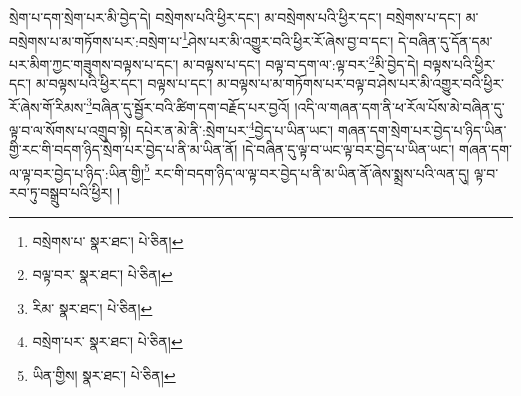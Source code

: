 སྲེག་པ་དག་སྲེག་པར་མི་བྱེད་དེ། བསྲེགས་པའི་ཕྱིར་དང་། མ་བསྲེགས་པའི་ཕྱིར་དང་། བསྲེགས་པ་དང་། མ་བསྲེགས་པ་མ་གཏོགས་པར་:བསྲེག་པ་\footnote{བསྲེགས་པ་  སྣར་ཐང་།  པེ་ཅིན། }ཤེས་པར་མི་འགྱུར་བའི་ཕྱིར་རོ་ཞེས་བྱ་བ་དང་། དེ་བཞིན་དུ་དོན་དམ་པར་མིག་ཀྱང་གཟུགས་བལྟས་པ་དང་། མ་བལྟས་པ་དང་། བལྟ་བ་དག་ལ་:ལྟ་བར་\footnote{བལྟ་བར་  སྣར་ཐང་།  པེ་ཅིན། }མི་བྱེད་དེ། བལྟས་པའི་ཕྱིར་དང་། མ་བལྟས་པའི་ཕྱིར་དང་། བལྟས་པ་དང་། མ་བལྟས་པ་མ་གཏོགས་པར་བལྟ་བ་ཤེས་པར་མི་འགྱུར་བའི་ཕྱིར་རོ་ཞེས་གོ་རིམས་\footnote{རིམ་  སྣར་ཐང་།  པེ་ཅིན། }བཞིན་དུ་སྦྱོར་བའི་ཚིག་དག་བརྗོད་པར་བྱའོ། །འདི་ལ་གཞན་དག་ནི་ཕ་རོལ་པོས་མེ་བཞིན་དུ་ལྟ་བ་ལ་སོགས་པ་འགྲུབ་སྟེ། དཔེར་ན་མེ་ནི་:སྲེག་པར་\footnote{བསྲེག་པར་  སྣར་ཐང་།  པེ་ཅིན། }བྱེད་པ་ཡིན་ཡང་། གཞན་དག་སྲེག་པར་བྱེད་པ་ཉིད་ཡིན་གྱི་རང་གི་བདག་ཉིད་སྲེག་པར་བྱེད་པ་ནི་མ་ཡིན་ནོ། །དེ་བཞིན་དུ་ལྟ་བ་ཡང་ལྟ་བར་བྱེད་པ་ཡིན་ཡང་། གཞན་དག་ལ་ལྟ་བར་བྱེད་པ་ཉིད་:ཡིན་གྱི།\footnote{ཡིན་གྱིས།  སྣར་ཐང་།  པེ་ཅིན། } རང་གི་བདག་ཉིད་ལ་ལྟ་བར་བྱེད་པ་ནི་མ་ཡིན་ནོ་ཞེས་སྨྲས་པའི་ལན་དུ། ལྟ་བ་རབ་ཏུ་བསྒྲུབ་པའི་ཕྱིར། །
